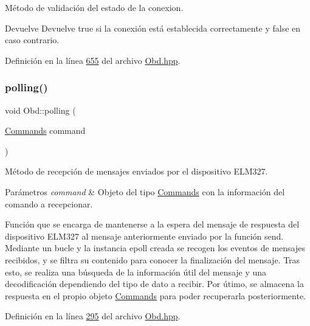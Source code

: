 Método de validación del estado de la conexion. 

\begin{DoxyReturn}{Devuelve}
Devuelve true si la conexión está establecida correctamente y false en caso contrario. 
\end{DoxyReturn}


Definición en la línea \hyperlink{Obd_8hpp_source_l00655}{655} del archivo \hyperlink{Obd_8hpp_source}{Obd.\+hpp}.

\mbox{\label{classObd_a0792ecb9247f32760269fdf64a178f8f}} 
\subsubsection{\texorpdfstring{polling()}{polling()}}
{\footnotesize\ttfamily void Obd\+::polling (\begin{DoxyParamCaption}\item[{\hyperlink{classCommands}{Commands}}]{command }\end{DoxyParamCaption})\hspace{0.3cm}{\ttfamily [inline]}}



Método de recepción de mensajes enviados por el dispositivo E\+L\+M327. 


\begin{DoxyParams}{Parámetros}
{\em command} & Objeto del tipo \hyperlink{classCommands}{Commands} con la información del comando a recepcionar.\\
\hline
\end{DoxyParams}
Función que se encarga de mantenerse a la espera del mensaje de respuesta del dispositivo E\+L\+M327 al mensaje anteriormente enviado por la función send. Mediante un bucle y la instancia epoll creada se recogen los eventos de mensajes recibidos, y se filtra su contenido para conocer la finalización del mensaje. Tras esto, se realiza una búsqueda de la información útil del mensaje y una decodificación dependiendo del tipo de dato a recibir. Por útimo, se almacena la respuesta en el propio objeto \hyperlink{classCommands}{Commands} para poder recuperarla posteriormente. 

Definición en la línea \hyperlink{Obd_8hpp_source_l00295}{295} del archivo \hyperlink{Obd_8hpp_source}{Obd.\+hpp}.

\mbox{\label{classObd_abf7e84f45236ea1c78c762ac895c532c}} 

